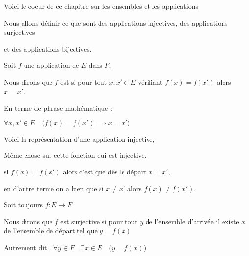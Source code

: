 





\debuttexte

\diapo

\change

Voici le coeur de ce chapitre sur les ensembles et les applications.

\change

Nous allons définir ce que sont des applications injectives, des applications surjectives

\change

et des applications bijectives.


\diapo

Soit $f$ une application de $E$ dans $F$.

Nous dirons que $f$ est  si pour tout $x,x' \in E$ vérifiant $f(x)=f(x')$ alors $x=x'$.


\change

En terme de phrase mathématique : 

$\forall x, x' \in E \quad \big( f(x)=f(x') \implies x=x'\big)$


\change

Voici la représentation d'une application injective,

\change

Même chose sur cette fonction qui est injective.

\change

si $f(x) = f(x')$ alors c'est que dès le départ $x=x'$,

en d'autre terme on a bien que si $x\neq x'$ alors $f(x) \neq f(x')$.




\diapo


Soit toujours $f : E \to F$ 

Nous dirons que $f$ est surjective si pour tout $y$ de l'ensemble d'arrivée il existe $x$ de l'ensemble de départ 
tel que $y=f(x)$

\change

Autrement dit :
$\forall y \in F \quad \exists x \in E \quad \big( y = f(x) \big)$

\change

